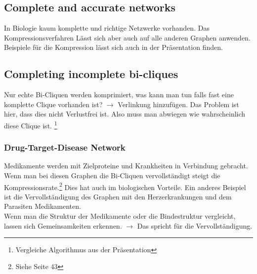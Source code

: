 \documentclass{article}
\begin{document}
\subsection{Complete and accurate networks}
In Biologie kaum komplette und richtige Netzwerke vorhanden. Das Kompressionsverfahren
Lässt sich aber auch auf alle anderen Graphen anwenden. Beispiele für die Kompression
lässt sich auch in der Präsentation finden.
\subsection{Completing incomplete bi-cliques}
Nur echte Bi-Cliquen werden komprimiert, was kann man tun falls fast eine komplette
Clique vorhanden ist? $\rightarrow$ Verlinkung hinzufügen. Das Problem ist hier,
dass dies nicht Verlustfrei ist. Also muss man abwiegen wie wahrscheinlich diese
Clique ist. \footnote{Vergleiche Algorithmus aus der Präsentation}
\subsubsection{Drug-Target-Disease Network}
Medikamente werden mit Zielproteine und Krankheiten in Verbindung gebracht.
Wenn man bei diesen Graphen die Bi-Cliquen vervollständigt steigt die 
Kompressionsrate.\footnote{Siehe Seite 43} Dies hat auch im biologischen
Vorteile. Ein anderes Beispiel ist die Vervollständigung des Graphen mit den
Herzerkrankungen und dem Parasiten Medikamenten.\\
Wenn man die Struktur der Medikamente oder die Bindestruktur vergleicht, lassen
sich Gemeinsamkeiten erkennen. $\rightarrow$ Das spricht für die Vervollständigung.
\end{document}
